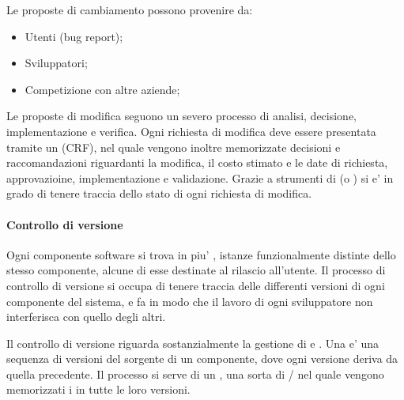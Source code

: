 Le proposte di cambiamento possono provenire da:

\begin{itemize}
	\item Utenti (bug report);
	\item Sviluppatori;
	\item Competizione con altre aziende;
\end{itemize}

Le proposte di modifica seguono un severo processo di analisi, decisione,
implementazione e verifica. Ogni richiesta di modifica deve essere presentata
tramite un  (CRF), nel quale vengono inoltre
memorizzate decisioni e raccomandazioni riguardanti la modifica, il costo
stimato e le date di richiesta, approvazioine, implementazione e validazione.
Grazie a strumenti di  (o ) si e'
in grado di tenere traccia dello stato di ogni richiesta di modifica.

\paragraph{Controllo di versione}

Ogni componente software si trova in piu' , istanze
funzionalmente distinte dello stesso componente, alcune di esse destinate al
rilascio all'utente. Il processo di controllo di versione si occupa di tenere
traccia delle differenti versioni di ogni componente del sistema, e fa in modo
che il lavoro di ogni sviluppatore non interferisca con quello degli altri.

Il controllo di versione riguarda sostanzialmente la gestione di
 e . Una  e' una
sequenza di versioni del sorgente di un componente, dove ogni versione deriva da
quella precedente. Il processo si serve di un , una sorta
di / nel quale vengono memorizzati i
 in tutte le loro versioni.

